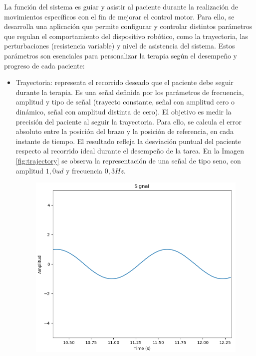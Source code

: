 La función del sistema es guiar y asistir al paciente durante la realización de movimientos específicos con el fin de mejorar el control motor.
Para ello, se desarrolla una aplicación que permite configurar y controlar distintos parámetros que regulan el comportamiento del dispositivo robótico, como la trayectoria, las perturbaciones (resistencia variable) y nivel de asistencia del sistema.
Estos parámetros son esenciales para personalizar la terapia según el desempeño y progreso de cada paciente:
\begin{itemize}
    \item Trayectoria: representa el recorrido deseado que el paciente debe seguir durante la terapia. Es una señal definida por los parámetros de frecuencia, amplitud y tipo de señal (trayecto constante, señal con amplitud cero o dinámico, señal con amplitud distinta de cero).
	El objetivo es medir la precisión del paciente al seguir la trayectoria. Para ello, se calcula el error absoluto entre la posición del brazo y la posición de referencia, en cada instante de tiempo. El resultado refleja la desviación puntual del paciente respecto al recorrido ideal durante el desempeño de la tarea.
	En la Imagen \ref{fig:trajectory} se observa la representación de una señal de tipo seno, con amplitud $1,0 ud$ y frecuencia $0,3 Hz$.
	\begin{figure}[ht!]
		\centering
		\begin{minipage}{0.65\linewidth}
			\centering
			\includegraphics[width=\linewidth]{figs/trayectoria.png}
		\end{minipage}

\end{figure}
\end{itemize}
